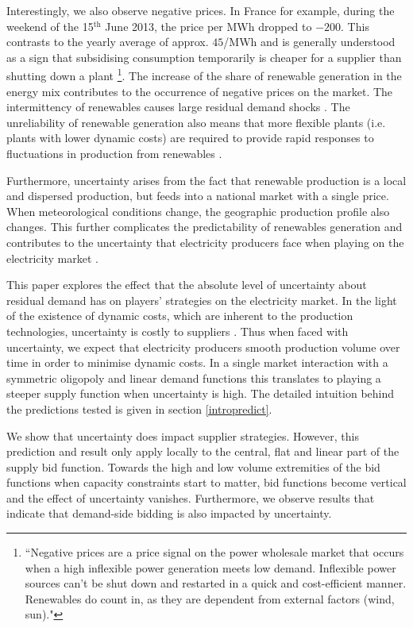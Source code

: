 Interestingly, we also observe negative prices. In France for example, during the weekend of the 15$^\text{th}$ June 2013, the price per MWh dropped to $-200$\EUR{}. This contrasts to the yearly average of approx. $ 45$\EUR{}/MWh and is generally understood as a sign that subsidising consumption temporarily is cheaper for a supplier than shutting down a plant \cite{epexwebsite1}\footnote{``Negative prices are a price signal on the power wholesale market that occurs when a high inflexible power generation meets low demand. Inflexible power sources can’t be shut down and restarted in a quick and cost-efficient manner. Renewables do count in, as they are dependent from external factors (wind, sun)."}.  The increase of the share of renewable generation in the energy mix contributes to the occurrence of negative prices on the market. 
The intermittency of renewables causes large residual demand shocks \cite{epexwebsite1}. The unreliability of renewable generation also means that more flexible plants (i.e. plants with lower dynamic costs) are required to provide rapid responses to fluctuations in production from renewables \cite{ren2013renewables}. 

Furthermore, uncertainty arises from the fact that renewable production is a local and dispersed production, but feeds into a national market with a single price. When meteorological conditions change, the geographic production profile also changes. This further complicates the predictability of renewables generation and contributes to the uncertainty that electricity producers face when playing %
on the electricity %
market \cite{meibom2009operational}.

This paper explores the effect that the absolute level of uncertainty about residual demand has on players' strategies on the electricity market. In the light of the existence of dynamic costs, which are inherent to the production technologies,  uncertainty is costly to suppliers \cite{bergesmartimort2014}. Thus when faced with uncertainty, we expect that electricity producers smooth production volume over time in order to minimise dynamic costs. In a single market interaction with a symmetric oligopoly and linear demand functions this translates to playing a steeper supply function when uncertainty is high. The detailed intuition behind the predictions tested is given in section \ref{intropredict}. 

\label{introresults}
We show that uncertainty does impact supplier strategies. However, this prediction and result only apply locally to the central, flat and linear part of the supply bid function. Towards the high and low volume extremities of the bid functions when capacity constraints start to matter, bid functions become vertical and the effect of uncertainty vanishes. Furthermore, we observe results that indicate that demand-side bidding is also impacted by uncertainty.  


